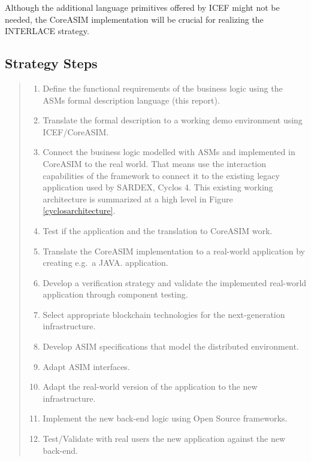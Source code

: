 Although the additional language primitives offered by ICEF might not be needed, the CoreASIM implementation will be crucial for realizing the INTERLACE strategy.

\subsection{Strategy Steps}\label{subsection-strategy-steps}

\begin{quote}
\small
\begin{enumerate}
	\item Define the functional requirements of the business logic using the ASMs formal description language (this report).
	\item Translate the formal description to a working demo environment using ICEF/CoreASIM.
	\item Connect the business logic modelled with ASMs and implemented in CoreASIM to the real world. That means use the interaction capabilities of the framework to connect it to the existing legacy application used by SARDEX, Cyclos 4. This existing working architecture is summarized at a high level in Figure \ref{cyclosarchitecture}.
	\item Test if the application and the translation to CoreASIM work.
	\item Translate the CoreASIM implementation to a real-world application by creating e.g.\ a JAVA. application.
	\item Develop a verification strategy and validate the implemented real-world application through component testing.
	\item Select appropriate blockchain technologies for the next-generation infrastructure.
	\item Develop ASIM specifications that model the distributed environment.
	\item Adapt ASIM interfaces.
	\item Adapt the real-world version of the application to the new infrastructure.
	\item Implement the new back-end logic using Open Source frameworks.
	\item Test/Validate with real users the new application against the new back-end.
\end{enumerate}
\end{quote}


